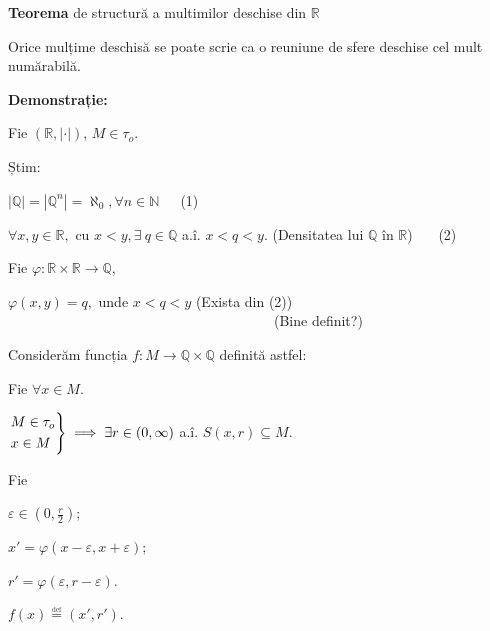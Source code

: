 \documentclass[11pt]{article}
\date{}
\title{}
\begin{document}
\textbf{Teorema} de structură a multimilor deschise din $\mathbb{R}$
\vspace{7}

Orice mulțime deschisă se poate scrie ca o reuniune de sfere deschise cel mult numărabilă.

\vspace{7}
\textbf{Demonstrație:}
\vspace{7}

Fie $(\mathbb{R}, |\cdot|)$, $M \in \tau_o $.

Știm:

$| \mathbb{Q} | = | \mathbb{Q}^n | =\aleph_0, \forall n \in \mathbb{N}$\ \ \ (1)

$\forall x, y \in \mathbb{R},$ cu $x < y, \exists\ q \in \mathbb{Q}$ a.î. $x < q < y.$ (Densitatea lui $\mathbb{Q}$ în $\mathbb{R}$) \ \ \ (2)

\vspace{7}

Fie
$\varphi : \mathbb{R} \times \mathbb{R} \to \mathbb{Q}$,

$\varphi(x, y) = q, $ unde $x < q < y$ (Exista din (2))
\ \ \ \ \ \ \ \ \ \ \ \ \ \ \ \ \ \ \ \ \ \ \ \ \ \ \ \ \ \ \ \ \ \ \ \ \ \ (Bine definit?)

\vspace{7}

Considerăm funcția $f : M \to \mathbb{Q} \times \mathbb{Q} $ definită astfel:

Fie $\forall x \in M$.

$\begin{rcases}
M \in \tau_o \\
x \in M
\end{rcases}
\implies \exists r \in (0, \infty)$ a.î. $S(x, r) \subseteq M$.

\vspace{7}
Fie

$\varepsilon \in \left(0, \frac{r}{2}\right)$;

$x' = \varphi\left(x - \varepsilon, x + \varepsilon\right)$;

$r' = \varphi\left(\varepsilon, r-\varepsilon \right)$.

$f(x) \overset{\underset{\mathrm{def}}{}}{=} (x', r')$.
\end{document}
